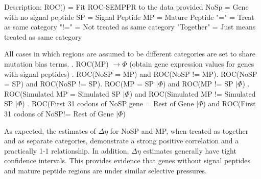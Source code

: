 \documentclass[11pt]{labbook}
\begin{document}
Description:\newline
ROC() = Fit ROC-SEMPPR to the data provided \newline 
NoSp = Gene with no signal peptide\newline
SP = Signal Peptide \newline
MP = Mature Peptide\newline
"=" = Treat as same category \newline
"!=" = Not treated as same category \newline
"Together" = Just means treated as same category

All cases in which regions are assumed to be different categories are set to share mutation bias terms.
. ROC(MP) $\rightarrow \Phi$ (obtain gene expression values for genes with signal peptides) . ROC(NoSP = MP) and ROC(NoSP != MP). ROC(NoSP = SP) and ROC(NoSP != SP). ROC(MP = SP $|\Phi$) and ROC(MP != SP $|\Phi$) . ROC(Simulated MP = Simulated SP $|\Phi$) and ROC(Simulated MP != Simulated SP $|\Phi$) . ROC(First 31 codons of NoSP gene = Rest of Gene $|\Phi$) and ROC(First 31 codons of NoSP!= Rest of Gene $|\Phi$)

As expected, the estimates of $\Delta\eta$ for NoSP and MP, when treated as together and as separate categories, demonstrate a strong positive correlation and a practically 1-1 relationship. In addition, $\Delta\eta$ estimates generally have tight confidence intervals. This provides evidence that genes without signal peptides and mature peptide regions are under similar selective pressures. 
\end{document}
